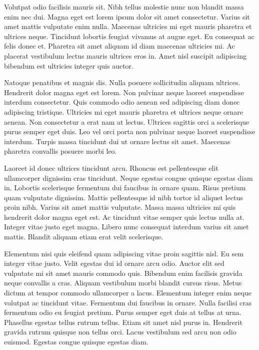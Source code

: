 \documentclass[11pt,a4paper]{article}
\begin{document}
Volutpat odio facilisis mauris sit. Nibh tellus molestie nunc non blandit massa enim nec dui. Magna eget est lorem ipsum dolor sit amet consectetur. Varius sit amet mattis vulputate enim nulla. Maecenas ultricies mi eget mauris pharetra et ultrices neque. Tincidunt lobortis feugiat vivamus at augue eget. Eu consequat ac felis donec et. Pharetra sit amet aliquam id diam maecenas ultricies mi. Ac placerat vestibulum lectus mauris ultrices eros in. Amet nisl suscipit adipiscing bibendum est ultricies integer quis auctor.

Natoque penatibus et magnis dis. Nulla posuere sollicitudin aliquam ultrices. Hendrerit dolor magna eget est lorem. Non pulvinar neque laoreet suspendisse interdum consectetur. Quis commodo odio aenean sed adipiscing diam donec adipiscing tristique. Ultricies mi eget mauris pharetra et ultrices neque ornare aenean. Non consectetur a erat nam at lectus. Ultrices sagittis orci a scelerisque purus semper eget duis. Leo vel orci porta non pulvinar neque laoreet suspendisse interdum. Turpis massa tincidunt dui ut ornare lectus sit amet. Maecenas pharetra convallis posuere morbi leo.

Laoreet id donec ultrices tincidunt arcu. Rhoncus est pellentesque elit ullamcorper dignissim cras tincidunt. Neque egestas congue quisque egestas diam in. Lobortis scelerisque fermentum dui faucibus in ornare quam. Risus pretium quam vulputate dignissim. Mattis pellentesque id nibh tortor id aliquet lectus proin nibh. Varius sit amet mattis vulputate. Massa massa ultricies mi quis hendrerit dolor magna eget est. Ac tincidunt vitae semper quis lectus nulla at. Integer vitae justo eget magna. Libero nunc consequat interdum varius sit amet mattis. Blandit aliquam etiam erat velit scelerisque.

Elementum nisi quis eleifend quam adipiscing vitae proin sagittis nisl. Eu sem integer vitae justo. Velit egestas dui id ornare arcu odio. Auctor elit sed vulputate mi sit amet mauris commodo quis. Bibendum enim facilisis gravida neque convallis a cras. Aliquam vestibulum morbi blandit cursus risus. Metus dictum at tempor commodo ullamcorper a lacus. Elementum integer enim neque volutpat ac tincidunt vitae. Fermentum dui faucibus in ornare. Nulla facilisi cras fermentum odio eu feugiat pretium. Purus semper eget duis at tellus at urna. Phasellus egestas tellus rutrum tellus. Etiam sit amet nisl purus in. Hendrerit gravida rutrum quisque non tellus orci. Lacus vestibulum sed arcu non odio euismod. Egestas congue quisque egestas diam.
\end{document}
